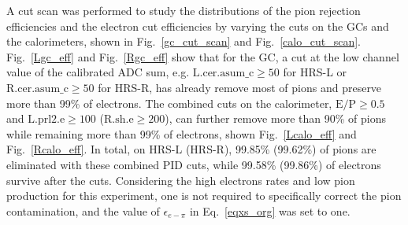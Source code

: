   A cut scan was performed to study the distributions of the pion rejection efficiencies and the electron cut efficiencies by varying the cuts on the GCs and the calorimeters, shown in Fig.~\ref{gc_cut_scan} and Fig.~\ref{calo_cut_scan}. Fig.~\ref{Lgc_eff} and Fig.~\ref{Rgc_eff} show that for the GC, a cut at the low channel value of the calibrated ADC sum, e.g. $\mathrm{L.cer.asum\_c\geq 50}$ for HRS-L or $\mathrm{R.cer.asum\_c\geq 50}$ for HRS-R, has already remove most of pions and preserve more than 99\% of electrons. The combined cuts on the calorimeter, $\mathrm{E/P\geq 0.5}$ and $\mathrm{L.prl2.e\geq 100}$ ($\mathrm{R.sh.e\geq 200}$), can further remove more than 90\% of pions while remaining more than 99\% of electrons, shown Fig.~\ref{Lcalo_eff} and Fig.~\ref{Rcalo_eff}. In total, on HRS-L (HRS-R), 99.85\% (99.62\%) of pions are eliminated with these combined PID cuts, while 99.58\% (99.86\%) of electrons survive after the cuts. Considering the high electrons rates and low pion production for this experiment, one is not required to specifically correct the pion contamination, and the value of $\epsilon_{e-\pi}$ in Eq.~\eqref{eqxs_org} was set to one.
